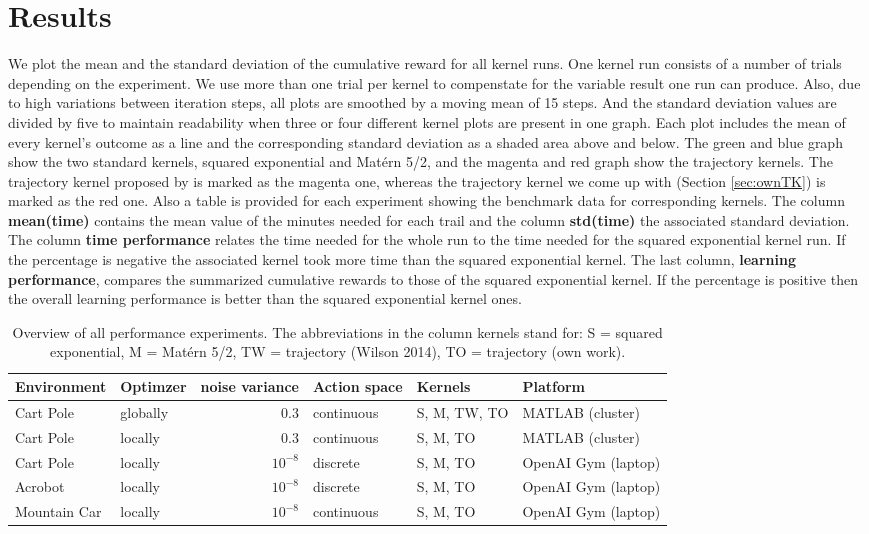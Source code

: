 \chapter{Results}
\label{chap:5}
%
We plot the mean and the standard deviation of the cumulative reward for all kernel runs. One kernel run consists of a number of trials depending on the experiment. We use more than one trial per kernel to compenstate for the variable result one run can produce. Also, due to high variations between iteration steps, all plots are smoothed by a moving mean of 15 steps. And the standard deviation values are divided by five to maintain readability when three or four different kernel plots are present in one graph. Each plot includes the mean of every kernel's outcome as a line and the corresponding standard deviation as a shaded area above and below. The green and blue graph show the two standard kernels, squared exponential and Matérn 5/2, and the magenta and red graph show the trajectory kernels. The trajectory kernel proposed by \cite{wilson2014using} is marked as the magenta one, whereas the trajectory kernel we come up with (Section \ref{sec:ownTK}) is marked as the red one. Also a table is provided for each experiment showing the benchmark data for corresponding kernels. The column \textbf{mean(time)} contains the mean value of the minutes needed for each trail and the column \textbf{std(time)} the associated standard deviation. The column \textbf{time performance} relates the time needed for the whole run to the time needed for the squared exponential kernel run. If the percentage is negative the associated kernel took more time than the squared exponential kernel. The last column, \textbf{learning performance}, compares the summarized cumulative rewards to those of the squared exponential kernel. If the percentage is positive then the overall learning performance is better than the squared exponential kernel ones.

\begin{table}[h]
    \centering
    \begin{tabular}{|l|l|r|l|l|l|}\hline
        Environment & Optimzer & noise variance & Action space & Kernels & Platform\\\hline
        Cart Pole & globally & 0.3 & continuous & S, M, TW, TO & MATLAB (cluster)\\\hline
        Cart Pole & locally & 0.3 & continuous & S, M, TO & MATLAB (cluster)\\\hline
        Cart Pole & locally & $10^{-8}$ & discrete & S, M, TO & OpenAI Gym (laptop)\\\hline
        Acrobot & locally & $10^{-8}$ & discrete & S, M, TO & OpenAI Gym (laptop)\\\hline
        Mountain Car & locally & $10^{-8}$ & continuous & S, M, TO & OpenAI Gym (laptop)\\\hline
    \end{tabular}
    \caption{Overview of all performance experiments. The abbreviations in the column kernels stand for: S = squared exponential, M = Matérn 5/2, TW = trajectory (Wilson 2014), TO = trajectory (own work).\label{table:xps}}
\end{table}


